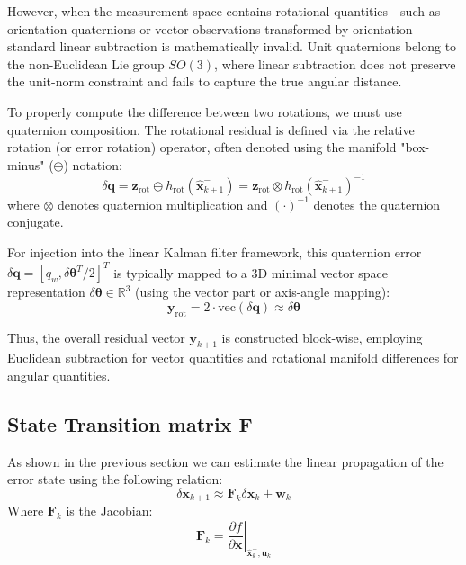 \documentclass{article}
\begin{document}
	However, when the measurement space contains rotational quantities—such as orientation quaternions or vector observations transformed by orientation—standard linear subtraction is mathematically invalid. Unit quaternions belong to the non-Euclidean Lie group $SO(3)$, where linear subtraction does not preserve the unit-norm constraint and fails to capture the true angular distance.
	
	To properly compute the difference between two rotations, we must use quaternion composition. The rotational residual is defined via the relative rotation (or error rotation) operator, often denoted using the manifold "box-minus" ($\ominus$) notation:
	\begin{equation}
		\delta \mathbf{q} = \mathbf{z}_{\text{rot}} \ominus h_{\text{rot}}(\hat{\mathbf{x}}_{k+1}^-) = \mathbf{z}_{\text{rot}} \otimes h_{\text{rot}}(\hat{\mathbf{x}}_{k+1}^-)^{-1}
	\end{equation}
	where $\otimes$ denotes quaternion multiplication and $(\cdot)^{-1}$ denotes the quaternion conjugate.
	
	For injection into the linear Kalman filter framework, this quaternion error $\delta \mathbf{q} = [q_w, \delta \boldsymbol{\theta}^T/2]^T$ is typically mapped to a 3D minimal vector space representation $\delta \boldsymbol{\theta} \in \mathbb{R}^3$ (using the vector part or axis-angle mapping):
	\begin{equation}
		\mathbf{y}_{\text{rot}} = 2 \cdot \text{vec}(\delta \mathbf{q}) \approx \delta \boldsymbol{\theta}
	\end{equation}
	
	Thus, the overall residual vector $\mathbf{y}_{k+1}$ is constructed block-wise, employing Euclidean subtraction for vector quantities and rotational manifold differences for angular quantities.
	
	
	\subsection{State Transition matrix F}
	
	As shown in the previous section we can estimate the linear propagation of the error state using the following relation:
	\begin{equation*}
		\delta\mathbf{x}_{k+1} \approx \mathbf{F}_k \delta\mathbf{x}_k + \mathbf{w}_k
	\end{equation*}
	Where $\mathbf{F}_k$ is the Jacobian:
	\begin{equation*}
		\mathbf{F}_k = \left. \frac{\partial f}{\partial \mathbf{x}} \right|_{\hat{\mathbf{x}}_k^+, \mathbf{u}_k}
	\end{equation*}
	
\end{document}

